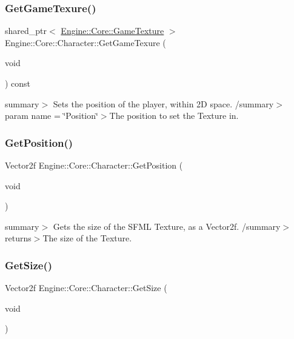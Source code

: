 \subsubsection{\texorpdfstring{Get\+Game\+Texure()}{GetGameTexure()}}
{\footnotesize\ttfamily shared\+\_\+ptr$<$ \hyperlink{class_engine_1_1_core_1_1_game_texture}{Engine\+::\+Core\+::\+Game\+Texture} $>$ Engine\+::\+Core\+::\+Character\+::\+Get\+Game\+Texure (\begin{DoxyParamCaption}\item[{void}]{ }\end{DoxyParamCaption}) const}

summary$>$ Sets the position of the player, within 2D space. /summary$>$ param name = \char`\"{}\+Position\char`\"{}$>$The position to set the Texture in.\mbox{\label{class_engine_1_1_core_1_1_character_aea290308ddc56ab784c87f85e6b7f254}} 
\subsubsection{\texorpdfstring{Get\+Position()}{GetPosition()}}
{\footnotesize\ttfamily Vector2f Engine\+::\+Core\+::\+Character\+::\+Get\+Position (\begin{DoxyParamCaption}\item[{void}]{ }\end{DoxyParamCaption})}

summary$>$ Gets the size of the S\+F\+ML Texture, as a Vector2f. /summary$>$ returns$>$The size of the Texture.\mbox{\label{class_engine_1_1_core_1_1_character_a3465481aed27d24909b8e40577f09b10}} 
\subsubsection{\texorpdfstring{Get\+Size()}{GetSize()}}
{\footnotesize\ttfamily Vector2f Engine\+::\+Core\+::\+Character\+::\+Get\+Size (\begin{DoxyParamCaption}\item[{void}]{ }\end{DoxyParamCaption})}


